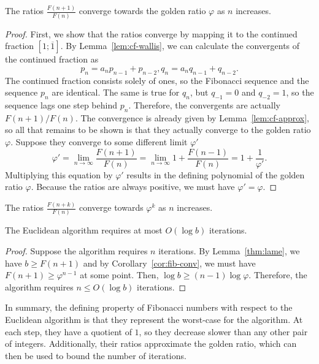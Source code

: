 \begin{lemma}
  The ratios $\frac{F(n+1)}{F(n)}$ converge towards the golden ratio $φ$ as $n$ increases.
\end{lemma}

\begin{proof}
  First, we show that the ratios converge by mapping it to the continued fraction $[1; \overline{1}]$.
  By Lemma~\ref{lem:cf-wallis}, we can calculate the convergents of the continued fraction as
  \[
    p_n = a_n p_{n-1} + p_{n-2}, q_n = a_n q_{n-1} + q_{n-2}.
  \]
  The continued fraction consists solely of ones,
  so the Fibonacci sequence and the sequence $p_n$ are identical.
  The same is true for $q_n$, but $q_{-1} = 0$ and $q_{-2} = 1$, so the sequence lags one step behind $p_n$.
  Therefore, the convergents are actually $F(n+1)/F(n)$.
  The convergence is already given by Lemma~\vref{lem:cf-approx},
  so all that remains to be shown is that they actually converge to the golden ratio $φ$.
  Suppose they converge to some different limit $φ'$
  \[
    φ' = \lim_{n → ∞} \frac{F(n+1)}{F(n)} = \lim_{n → ∞} 1 + \frac{F(n-1)}{F(n)} = 1 + \frac{1}{φ'}.
  \]
  Multiplying this equation by $φ'$ results in the defining polynomial of the golden ratio $φ$.
  Because the ratios are always positive, we must have $φ' = φ$.
\end{proof}

\begin{corollary}
  \label{cor:fib-conv}
  The ratios $\frac{F(n+k)}{F(n)}$ converge towards $φ^k$ as $n$ increases.
\end{corollary}

\begin{theorem}
  The Euclidean algorithm requires at most $O(\log b)$ iterations.
\end{theorem}

\begin{proof}
  Suppose the algorithm requires $n$ iterations.
  By Lemma~\ref{thm:lame}, we have $b ≥ F(n+1)$
  and by Corollary~\ref{cor:fib-conv}, we must have $F(n+1) ≥ φ^{n-1}$ at some point.
  Then, $\log b ≥ (n - 1) \log φ$.
  Therefore, the algorithm requires $n ≤ O(\log b)$ iterations.
\end{proof}

In summary,
the defining property of Fibonacci numbers with respect to the Euclidean
algorithm is that they represent the worst-case for the algorithm.
At each step, they have a quotient of $1$, so they decrease slower than any other pair of integers.
Additionally, their ratios approximate the golden ratio,
which can then be used to bound the number of iterations.

